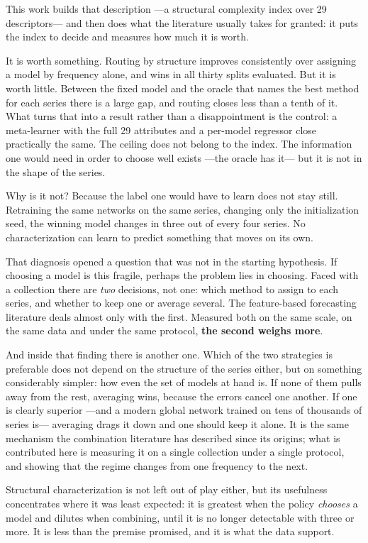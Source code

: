 This work builds that description ---a structural complexity index over 29 descriptors---
and then does what the literature usually takes for granted: it puts the index to decide
and measures how much it is worth.

It is worth something. Routing by structure improves consistently over assigning a model
by frequency alone, and wins in all thirty splits evaluated. But it is worth little.
Between the fixed model and the oracle that names the best method for each series there
is a large gap, and routing closes less than a tenth of it. What turns that into a result
rather than a disappointment is the control: a meta-learner with the full 29 attributes
and a per-model regressor close practically the same. The ceiling does not belong to the
index. The information one would need in order to choose well exists ---the oracle has
it--- but it is not in the shape of the series.

Why is it not? Because the label one would have to learn does not stay still. Retraining
the same networks on the same series, changing only the initialization seed, the winning
model changes in three out of every four series. No characterization can learn to predict
something that moves on its own.

That diagnosis opened a question that was not in the starting hypothesis. If choosing a
model is this fragile, perhaps the problem lies in choosing. Faced with a collection there
are \emph{two} decisions, not one: which method to assign to each series, and whether to
keep one or average several. The feature-based forecasting literature deals almost only
with the first. Measured both on the same scale, on the same data and under the same
protocol, \textbf{the second weighs more}.

And inside that finding there is another one. Which of the two strategies is preferable
does not depend on the structure of the series either, but on something considerably
simpler: how even the set of models at hand is. If none of them pulls away from the rest,
averaging wins, because the errors cancel one another. If one is clearly superior ---and a
modern global network trained on tens of thousands of series is--- averaging drags it down
and one should keep it alone. It is the same mechanism the combination literature has
described since its origins; what is contributed here is measuring it on a single
collection under a single protocol, and showing that the regime changes from one frequency
to the next.

Structural characterization is not left out of play either, but its usefulness
concentrates where it was least expected: it is greatest when the policy \emph{chooses} a
model and dilutes when combining, until it is no longer detectable with three or more. It
is less than the premise promised, and it is what the data support.

